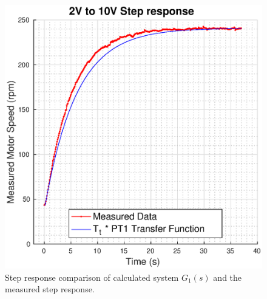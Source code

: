 \begin{figure}[t]
    \centering
    \includegraphics[width=\imagewidth]{images/Tt_PT1}
    \caption{Step response comparison of calculated system $G_1(s)$ and the measured step response.}
    \label{fig:Tt_PT1_step}
\end{figure}

